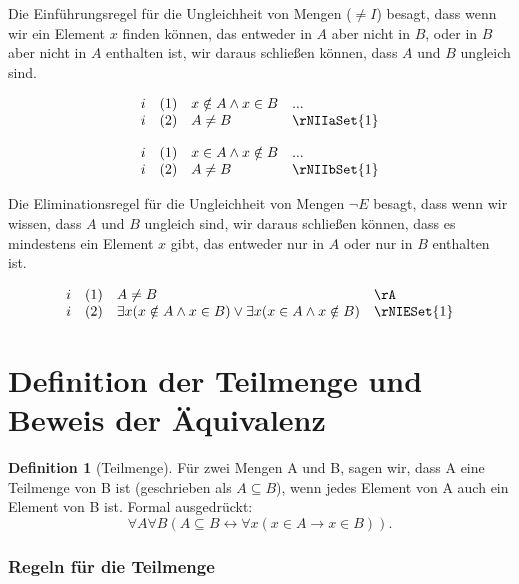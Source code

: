 \documentclass{book}
\theoremstyle{plain}
\theoremstyle{remark}
\theoremstyle{definition}
\newtheorem{definition}{Definition}[section]
\begin{document}
Die Einführungsregel für die Ungleichheit von Mengen ($\neq I$) besagt, dass wenn wir ein Element \(x\) finden können, das entweder in \(A\) aber nicht in \(B\), oder in \(B\) aber nicht in \(A\) enthalten ist, wir daraus schließen können, dass \(A\) und \(B\) ungleich sind.

\[
\begin{array}{llll}
	i & (1) & x \notin A \land x \in B & ... \\
	i & (2) & A \neq B & \rNIIaSet{1} \\
\end{array}
\]

\[
\begin{array}{llll}
	i & (1) & x \in A \land x \notin B & ... \\
	i & (2) & A \neq B & \rNIIbSet{1} \\
\end{array}
\]

Die Eliminationsregel für die Ungleichheit von Mengen \(\neg E\) besagt, dass wenn wir wissen, dass \(A\) und \(B\) ungleich sind, wir daraus schließen können, dass es mindestens ein Element \(x\) gibt, das entweder nur in \(A\) oder nur in \(B\) enthalten ist.

\[
\begin{array}{llll}
	i & (1) & A \neq B & \rA \\
	i & (2) & \exists x (x \notin A \land x \in B) \lor \exists x (x \in A \land x \notin B) & \rNIESet{1} \\
\end{array}
\]




\section{Definition der Teilmenge und Beweis der Äquivalenz}

\begin{definition}[Teilmenge]
	Für zwei Mengen A und B, sagen wir, dass A eine Teilmenge von B ist (geschrieben als \(A \subseteq B\)), wenn jedes Element von A auch ein Element von B ist. Formal ausgedrückt: 
	\[
	\forall A\forall B(A \subseteq B \leftrightarrow \forall x (x \in A \rightarrow x \in B)).
	\]
\end{definition}

\subsubsection{Regeln für die Teilmenge}
\label{rule:SubsetE} \label{rule:SubsetI}
\end{document}
